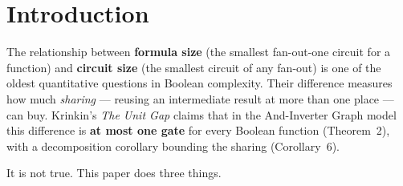 \documentclass[11pt]{article}
\DeclareMathOperator{\gapop}{gap}
\newcommand{\gapx}{\gapop_{\mathrm{XAG}}}
\theoremstyle{plain}
\begin{document}
\begin{abstract}
3). An exhaustive census over the 222 NPN classes of $n = 4$ shows the failure is structural: 72 of
222 classes have $\gapop \ge 2$, the maximum gap 6 attained by three distinct
NPN classes (distinguished by their XAG optima 6/5/3), one of which is parity-4. Finally, the
phenomenon is \textbf{base-dependent}. In the XOR-AND-graph (XAG) basis the unit-gap property holds
for $n \le 4$ (under a separately gated exact-synthesis pipeline whose UNSAT side is not
proof-certified): $\gapx = 0$ for all 256 functions of $n = 3$ and $\gapx \in \{0,1\}$ for all 222
classes of $n = 4$; a directed search over 25{,}373 distinct essential functions of $n = 5$
\textbf{found no separator}: all 25{,}169 gap-decided functions have $\gapx \in \{0,1\}$, and 204
remain unresolved. A replicated MIG census matching Soeken et al.'s published size
distribution bucket by bucket gives an aggregate external cross-check. The large AIG gaps are
consistent with the cost of simulating linear (parity) structure without a native XOR gate.
\end{abstract}

\section{Introduction}

The relationship between \textbf{formula size} (the smallest fan-out-one circuit for a function) and
\textbf{circuit size} (the smallest circuit of any fan-out) is one of the oldest quantitative
questions in Boolean complexity. Their difference measures how much \emph{sharing} --- reusing an
intermediate result at more than one place --- can buy. Krinkin's \emph{The Unit Gap} claims that in
the And-Inverter Graph model this difference is \textbf{at most one gate} for every Boolean function
(Theorem~2), with a decomposition corollary bounding the sharing (Corollary~6).

It is not true. This paper does three things.
\end{document}
